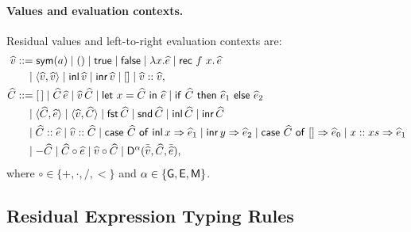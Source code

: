 \paragraph{Values and evaluation contexts.}
Residual values and left-to-right evaluation contexts are:
\[
\begin{aligned}
\widehat v
  &::=\mathsf{sym}(a)\mid()\mid\mathsf{true}\mid\mathsf{false}
    \mid\lambda x.\widehat e
    \mid\mathsf{rec}\ f\ x.\,\widehat e\\
  &\quad\mid\langle\widehat v,\widehat v\rangle
    \mid\mathsf{inl}\,\widehat v
    \mid\mathsf{inr}\,\widehat v
    \mid[]\mid\widehat v::\widehat v,\\
\widehat C
  &::=[\,]\mid\widehat C\,\widehat e
    \mid\widehat v\,\widehat C
    \mid\mathsf{let}\ x=\widehat C\ \mathsf{in}\ \widehat e
    \mid\mathsf{if}\ \widehat C\ \mathsf{then}\ \widehat e_1\ \mathsf{else}\ \widehat e_2\\
  &\quad\mid\langle\widehat C,\widehat e\rangle
    \mid\langle\widehat v,\widehat C\rangle
    \mid\mathsf{fst}\,\widehat C
    \mid\mathsf{snd}\,\widehat C
    \mid\mathsf{inl}\,\widehat C
    \mid\mathsf{inr}\,\widehat C\\
  &\quad\mid\widehat C::\widehat e
    \mid\widehat v::\widehat C
    \mid\mathsf{case}\ \widehat C\ \mathsf{of}\ \mathsf{inl}\,x\Rightarrow \widehat e_1\mid\mathsf{inr}\,y\Rightarrow \widehat e_2
    \mid\mathsf{case}\ \widehat C\ \mathsf{of}\ []\Rightarrow \widehat e_0\mid x::xs\Rightarrow \widehat e_1\\
  &\quad\mid-\widehat C
    \mid\widehat C\mathbin\circ\widehat e
    \mid\widehat v\mathbin\circ\widehat C
    \mid\mathsf{D}^{\alpha}(\bar{\widehat v},\widehat C,\bar{\widehat e}),
\end{aligned}
\]
where $\circ\in\{+,\cdot,/,<\}$ and
$\alpha\in\{\mathsf{G},\mathsf{E},\mathsf{M}\}$.

\subsection{Residual Expression Typing Rules}

